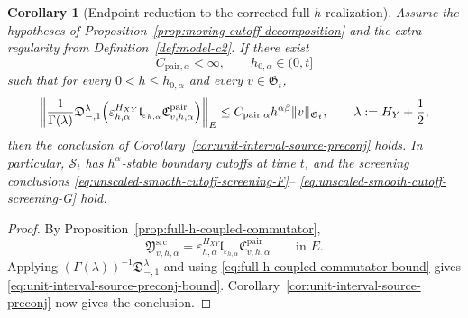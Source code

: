 \documentclass[11pt,a4paper]{amsart}
\theoremstyle{plain}
\newtheorem{corollary}[theorem]{Corollary}
\theoremstyle{definition}
\theoremstyle{remark}
\begin{document}
\begin{corollary}[Endpoint reduction to the corrected full-\(h\) realization]
\label{cor:full-h-coupled-commutator}
Assume the hypotheses of Proposition~\ref{prop:moving-cutoff-decomposition} and the extra
regularity from Definition~\ref{def:model-c2}. If there exist
\[
C_{\mathrm{pair},\alpha}<\infty,
\qquad
h_{0,\alpha}\in(0,t]
\]
such that for every \(0<h\le h_{0,\alpha}\) and every \(v\in\mathfrak G_t\),
\begin{equation}\label{eq:full-h-coupled-commutator-bound}
\left\|
\frac{1}{\Gamma(\lambda)}
\mathfrak D_{-,1}^{\lambda}
\Bigl(
\varepsilon_{h,\alpha}^{H_{XY}}
\mathfrak l_{\varepsilon_{h,\alpha}}
\mathfrak C_{v,h,\alpha}^{\mathrm{pair}}
\Bigr)
\right\|_{E}
\le
C_{\mathrm{pair},\alpha}h^{\alpha\beta}\|v\|_{\mathfrak G_t},
\qquad
\lambda:=H_Y+\frac12,
\end{equation}
then the conclusion of Corollary~\ref{cor:unit-interval-source-preconj} holds. In particular,
\(\mathcal S_t\) has \(h^\alpha\)-stable boundary cutoffs at time \(t\), and the screening
conclusions \eqref{eq:unscaled-smooth-cutoff-screening-F}--
\eqref{eq:unscaled-smooth-cutoff-screening-G} hold.
\end{corollary}

\begin{proof}
By Proposition~\ref{prop:full-h-coupled-commutator},
\[
\mathfrak Y_{v,h,\alpha}^{\mathrm{src}}
=
\varepsilon_{h,\alpha}^{H_{XY}}
\mathfrak l_{\varepsilon_{h,\alpha}}
\mathfrak C_{v,h,\alpha}^{\mathrm{pair}}
\qquad\text{in }E.
\]
Applying \((\Gamma(\lambda))^{-1}\mathfrak D_{-,1}^{\lambda}\) and using
\eqref{eq:full-h-coupled-commutator-bound} gives \eqref{eq:unit-interval-source-preconj-bound}.
Corollary~\ref{cor:unit-interval-source-preconj} now gives the conclusion.
\end{proof}
\end{document}
